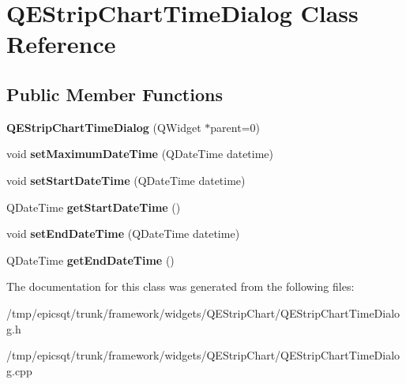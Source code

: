 \hypertarget{classQEStripChartTimeDialog}{
\section{QEStripChartTimeDialog Class Reference}
\label{classQEStripChartTimeDialog}
}
\subsection*{Public Member Functions}
\begin{DoxyCompactItemize}
\item 
\hypertarget{classQEStripChartTimeDialog_a8a9611d342dfb512d68a559910b0776e}{
{\bfseries QEStripChartTimeDialog} (QWidget $\ast$parent=0)}
\label{classQEStripChartTimeDialog_a8a9611d342dfb512d68a559910b0776e}

\item 
\hypertarget{classQEStripChartTimeDialog_acb593272af841e30abf75469bd36bcfb}{
void {\bfseries setMaximumDateTime} (QDateTime datetime)}
\label{classQEStripChartTimeDialog_acb593272af841e30abf75469bd36bcfb}

\item 
\hypertarget{classQEStripChartTimeDialog_aa5078a1a235b1d3ff0defe8f57e743a3}{
void {\bfseries setStartDateTime} (QDateTime datetime)}
\label{classQEStripChartTimeDialog_aa5078a1a235b1d3ff0defe8f57e743a3}

\item 
\hypertarget{classQEStripChartTimeDialog_aadb648535d420c3cce9622bd8dcff2b8}{
QDateTime {\bfseries getStartDateTime} ()}
\label{classQEStripChartTimeDialog_aadb648535d420c3cce9622bd8dcff2b8}

\item 
\hypertarget{classQEStripChartTimeDialog_a6c046cad102f673c951c3e23201f5fdf}{
void {\bfseries setEndDateTime} (QDateTime datetime)}
\label{classQEStripChartTimeDialog_a6c046cad102f673c951c3e23201f5fdf}

\item 
\hypertarget{classQEStripChartTimeDialog_a7d98d73fe8d7de9e578ad2af047afd75}{
QDateTime {\bfseries getEndDateTime} ()}
\label{classQEStripChartTimeDialog_a7d98d73fe8d7de9e578ad2af047afd75}

\end{DoxyCompactItemize}


The documentation for this class was generated from the following files:\begin{DoxyCompactItemize}
\item 
/tmp/epicsqt/trunk/framework/widgets/QEStripChart/QEStripChartTimeDialog.h\item 
/tmp/epicsqt/trunk/framework/widgets/QEStripChart/QEStripChartTimeDialog.cpp\end{DoxyCompactItemize}
